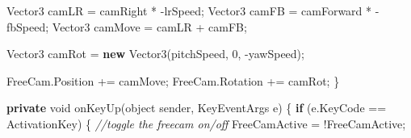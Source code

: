 \documentclass[
  openany]{book}
\newenvironment{Shaded}{\begin{snugshade}}{\end{snugshade}}
\newcommand{\CommentTok}[1]{\textcolor[rgb]{0.56,0.35,0.01}{\textit{#1}}}
\newcommand{\DataTypeTok}[1]{\textcolor[rgb]{0.13,0.29,0.53}{#1}}
\newcommand{\DecValTok}[1]{\textcolor[rgb]{0.00,0.00,0.81}{#1}}
\newcommand{\FunctionTok}[1]{\textcolor[rgb]{0.00,0.00,0.00}{#1}}
\newcommand{\KeywordTok}[1]{\textcolor[rgb]{0.13,0.29,0.53}{\textbf{#1}}}
\newcommand{\NormalTok}[1]{#1}
\begin{document}
\begin{Shaded}
\begin{Highlighting}[]
\NormalTok{            Vector3 camLR = camRight * -lrSpeed;}
\NormalTok{            Vector3 camFB = camForward * -fbSpeed;}
\NormalTok{            Vector3 camMove = camLR + camFB;}

\NormalTok{            Vector3 camRot = }\KeywordTok{new} \FunctionTok{Vector3}\NormalTok{(pitchSpeed, }\DecValTok{0}\NormalTok{, -yawSpeed);}

\NormalTok{            FreeCam.}\FunctionTok{Position}\NormalTok{ += camMove;}
\NormalTok{            FreeCam.}\FunctionTok{Rotation}\NormalTok{ += camRot;}
\NormalTok{        \}}

        \KeywordTok{private} \DataTypeTok{void} \FunctionTok{onKeyUp}\NormalTok{(}\DataTypeTok{object}\NormalTok{ sender, KeyEventArgs e)}
\NormalTok{        \{}
            \KeywordTok{if}\NormalTok{ (e.}\FunctionTok{KeyCode}\NormalTok{ == ActivationKey)}
\NormalTok{            \{}
                \CommentTok{//toggle the freecam on/off}
\NormalTok{                FreeCamActive = !FreeCamActive;}


\end{Highlighting}
\end{Shaded}
\end{document}
